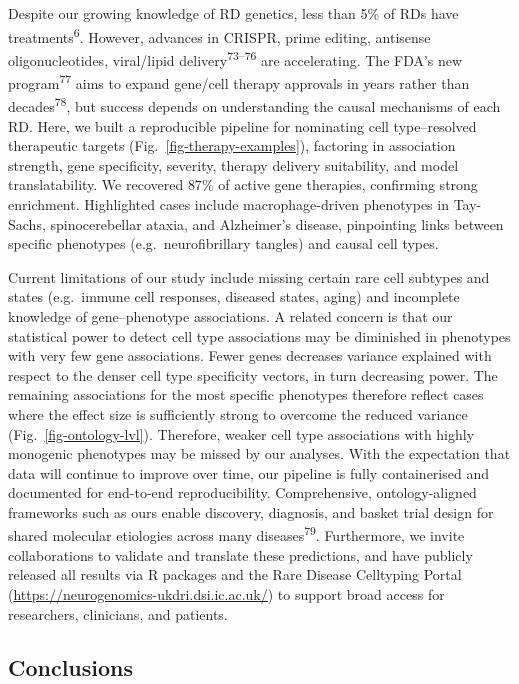 \documentclass[
]{article}
\begin{document}
Despite our growing knowledge of RD genetics, less than 5\% of RDs have
treatments\textsuperscript{6}. However, advances in CRISPR, prime
editing, antisense oligonucleotides, viral/lipid
delivery\textsuperscript{73--76} are accelerating. The FDA's new
program\textsuperscript{77} aims to expand gene/cell therapy approvals
in years rather than decades\textsuperscript{78}, but success depends on
understanding the causal mechanisms of each RD. Here, we built a
reproducible pipeline for nominating cell type--resolved therapeutic
targets (Fig.~\ref{fig-therapy-examples}), factoring in association
strength, gene specificity, severity, therapy delivery suitability, and
model translatability. We recovered \(87\)\% of active gene therapies,
confirming strong enrichment. Highlighted cases include
macrophage-driven phenotypes in Tay-Sachs, spinocerebellar ataxia, and
Alzheimer's disease, pinpointing links between specific phenotypes
(e.g.~neurofibrillary tangles) and causal cell types.

Current limitations of our study include missing certain rare cell
subtypes and states (e.g.~immune cell responses, diseased states, aging)
and incomplete knowledge of gene--phenotype associations. A related
concern is that our statistical power to detect cell type associations
may be diminished in phenotypes with very few gene associations. Fewer
genes decreases variance explained with respect to the denser cell type
specificity vectors, in turn decreasing power. The remaining
associations for the most specific phenotypes therefore reflect cases
where the effect size is sufficiently strong to overcome the reduced
variance (Fig.~\ref{fig-ontology-lvl}). Therefore, weaker cell type
associations with highly monogenic phenotypes may be missed by our
analyses. With the expectation that data will continue to improve over
time, our pipeline is fully containerised and documented for end-to-end
reproducibility. Comprehensive, ontology-aligned frameworks such as ours
enable discovery, diagnosis, and basket trial design for shared
molecular etiologies across many diseases\textsuperscript{79}.
Furthermore, we invite collaborations to validate and translate these
predictions, and have publicly released all results via R packages and
the Rare Disease Celltyping Portal
(\url{https://neurogenomics-ukdri.dsi.ic.ac.uk/}) to support broad
access for researchers, clinicians, and patients.

\subsection{Conclusions}\label{sec-conclusions}
\end{document}
